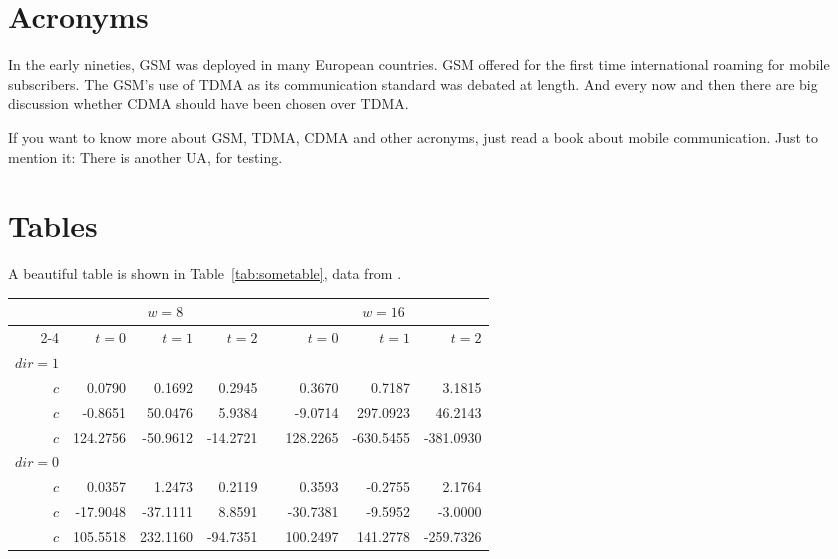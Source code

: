 \blindtext

\section{Acronyms}

In the early nineties, \acs{GSM} was deployed in many European countries. \ac{GSM} offered for the first time international roaming for mobile subscribers. The \acs{GSM}’s use of \ac{TDMA} as its communication standard was debated at length. And every now and then there are big discussion whether \ac{CDMA} should have been chosen over \ac{TDMA}.

If you want to know more about \acf{GSM}, \acf{TDMA}, \acf{CDMA} and other acronyms, just read a book about mobile communication. Just to mention it: There is another \ac{UA}, for testing.


\section{Tables}

A beautiful table is shown in Table~\ref{tab:sometable}, data from \textcite{Ebejer2012}.

\begin{table*}\centering
	\caption{A Beautiful and Complex Table (for tables captions above)}\label{tab:sometable}	
	\begin{tabular}{@{}rrrrcrrr@{}}\toprule
		& \multicolumn{3}{c}{$w = 8$} & \phantom{abc}& \multicolumn{3}{c}{$w = 16$} \\
		\cmidrule{2-4} \cmidrule{6-8} 
		& $t=0$ & $t=1$ & $t=2$ && $t=0$ & $t=1$ & $t=2$\\ \midrule
		$dir=1$\\
		$c$ & 0.0790 & 0.1692 & 0.2945 && 0.3670 & 0.7187 & 3.1815\\
		$c$ & -0.8651& 50.0476& 5.9384&& -9.0714& 297.0923& 46.2143\\
		$c$ & 124.2756& -50.9612& -14.2721&& 128.2265& -630.5455& -381.0930\\
		$dir=0$\\
		$c$ & 0.0357& 1.2473& 0.2119&& 0.3593& -0.2755& 2.1764\\
		$c$ & -17.9048& -37.1111& 8.8591&& -30.7381& -9.5952& -3.0000\\
		$c$ & 105.5518& 232.1160& -94.7351&& 100.2497& 141.2778& -259.7326\\
		\bottomrule
	\end{tabular}
\end{table*}

